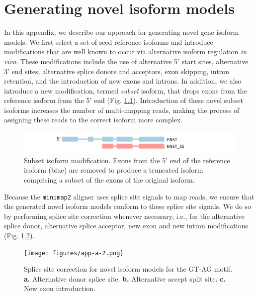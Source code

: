 
\chapter{Generating novel isoform models}\label{ap:gen-novl-iso}

In this appendix, we describe our approach for generating novel gene isoform models. We first select a set of seed reference isoforms and introduce modifications that are well known to occur via alternative isoform regulation \textit{in vivo}. These modifications include the use of alternative 5' start sites, alternative 3' end sites, alternative splice donors and acceptors, exon skipping, intron retention, and the introduction of new exons and introns. In addition, we also introduce a new modification, termed \textit{subset} isoform, that drops exons from the reference isoform from the 5' end (Fig. \ref{fig:app-a-1}). Introduction of these novel subset isoforms increases the number of multi-mapping reads, making the process of assigning these reads to the correct isoform more complex. 

\begin{figure}[H]
    \centering
    \includegraphics[width=\textwidth]{figures/app-a-1.png}
    \caption[Subset isoform modification]{Subset isoform modification. Exons from the 5' end of the reference isoform (blue) are removed to produce a truncated isoform comprising a subset of the exons of the original isoform.}
    \label{fig:app-a-1}
\end{figure}

Because the \texttt{minimap2} aligner uses splice site signals to map reads, we ensure that the generated novel isoform models conform to these splice site signals. We do so by performing splice site correction whenever necessary, i.e., for the alternative splice donor, alternative splice acceptor, new exon and new intron modifications (Fig. \ref{fig:app-a-2}). 

\begin{figure}[H]
    \centering
    \texttt{[image: figures/app-a-2.png]}
    \caption[Splice site correction for novel isoform models]{Splice site correction for novel isoform models for the GT-AG motif. \textbf{a.} Alternative donor splice site. \textbf{b.} Alternative accept split site. \textbf{c.} New exon introduction.}
    \label{fig:app-a-2}
\end{figure}

